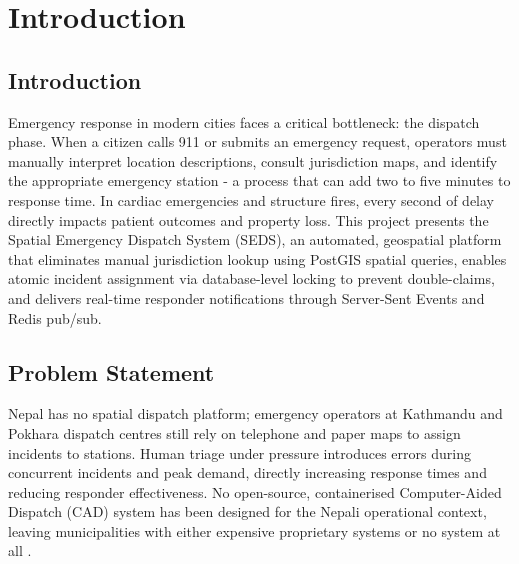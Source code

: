 \chapter{Introduction}

\section{Introduction}
Emergency response in modern cities faces a critical bottleneck: the dispatch phase. When a citizen calls 911 or submits an emergency request, operators must manually interpret location descriptions, consult jurisdiction maps, and identify the appropriate emergency station - a process that can add two to five minutes to response time. In cardiac emergencies and structure fires, every second of delay directly impacts patient outcomes and property loss. This project presents the Spatial Emergency Dispatch System (SEDS), an automated, geospatial platform that eliminates manual jurisdiction lookup using PostGIS spatial queries, enables atomic incident assignment via database-level locking to prevent double-claims, and delivers real-time responder notifications through Server-Sent Events and Redis pub/sub.

\section{Problem Statement}
Nepal has no spatial dispatch platform; emergency operators at Kathmandu and Pokhara dispatch centres still rely on telephone and paper maps to assign incidents to stations. Human triage under pressure introduces errors during concurrent incidents and peak demand, directly increasing response times and reducing responder effectiveness. No open-source, containerised Computer-Aided Dispatch (CAD) system has been designed for the Nepali operational context, leaving municipalities with either expensive proprietary systems or no system at all \cite{luxen2011realtime, zlatanova2004gis}.

